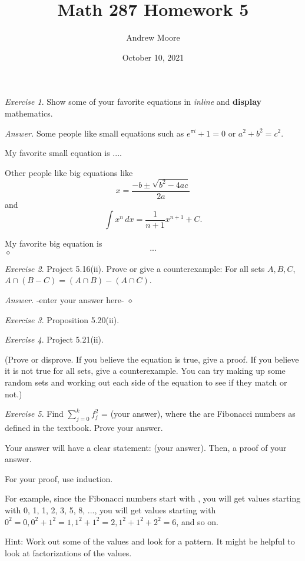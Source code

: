\documentclass[12pt,oneside]{amsart}
\title{Math 287 Homework 5}
\author{Andrew Moore}
\date{October 10, 2021} %
\theoremstyle{remark}
\newtheorem{exer}{Exercise}
\newenvironment{answer}{\bigskip\noindent\emph{Answer.}}{\hfill$\diamond$\newline}
\begin{document}
\maketitle

%
%
%
%
\begin{exer}
Show some of your favorite equations in \emph{inline} and \textbf{display} mathematics.
\end{exer}

\begin{answer}
Some people like small equations such as $e^{\pi i}+1 = 0$
or \( a^2+b^2 = c^2 \).

My favorite small equation is $...$.

Other people like big equations like $$ x = \frac{-b \pm \sqrt{b^2-4ac}}{2a} $$
and \[ \int x^n \, dx = \frac{1}{n+1} x^{n+1} + C . \]

My favorite big equation is
\[ ... \]
\end{answer}

%
%
%
%
\newpage
\begin{exer}
Project 5.16(ii). Prove or give a counterexample: For all sets $A,B,C$,
$A \cap (B-C) = (A \cap B) - (A \cap C)$.
\end{exer}


\begin{answer}
-enter your answer here-
\end{answer}

%
%
%
%
\begin{exer}
Proposition 5.20(ii).
\end{exer}

%
%
%
%
\begin{exer}
Project 5.21(ii).

(Prove or disprove. If you believe the equation is true, give a proof. If you believe it is not true for all sets, give a counterexample. You can try making up some random sets and working out each side of the equation to see if they match or not.)
\end{exer}

%
%
%
%
\begin{exer}
Find $\sum_{j = 0}^k f^2_j$ = (your answer), where the are Fibonacci numbers as defined in the textbook. Prove your answer.

Your answer will have a clear statement: (your answer). Then, a proof of your answer.

For your proof, use induction.

For example, since the Fibonacci numbers start with , you will get values starting with 0, 1, 1, 2, 3, 5, 8, ..., you will get values starting with $0^2 = 0, 0^2 + 1^2 = 1, 1^2 + 1^2 = 2, 1^2 + 1^2 + 2^2 = 6$, and so on.

Hint: Work out some of the values and look for a pattern. It might be helpful to look at factorizations of the values.
\end{exer}
\end{document}
